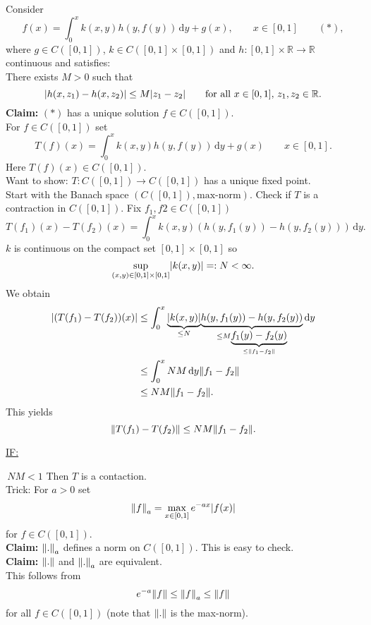 \begin{beispiel}
	Consider
	\[
		f(x) = \int_{0}^{x}k(x,y)h(y,f(y)) \,\mathrm{d}y + g(x), \qquad x \in [0,1] \qquad (*),
	\]
	where $g \in C([0,1])$, $k \in C([0,1] \times [0,1])$ and $h: [0,1] \times \mathbb{R} \to \mathbb{R}$ continuous and satisfies: \\
	There exists $M>0$ such that
	\[
		\lvert h(x,z_1)-h(x,z_2)\rvert \leq M \lvert z_1- z_2\rvert \qquad \text{for all }x \in [0,1],\,z_1,z_2 \in \mathbb{R}.
	\]
	\textbf{Claim:} \text{    }     $(*)$ has a unique solution $f \in C([0,1])$. \\ For $f \in C([0,1])$ set
	\[
		T(f)(x) = \int_{0}^{x}k(x,y)h(y,f(y)) \,\mathrm{d}y + g(x) \qquad x \in [0,1].
	\]
	Here $T(f)(x) \in C([0,1])$. \\ Want to show: $T: C([0,1]) \to C([0,1])$ has a unique fixed point. \\
	Start with the Banach space $(C([0,1]), \text{max-norm})$. Check if $T$ is a contraction in $C([0,1])$. Fix $f_1,f2 \in C([0,1])$
	\[
		T(f_1)(x)- T(f_2)(x) = \int_{0}^{x} k(x,y)(h(y,f_1(y))-h(y,f_2(y))) \,\mathrm{d}y.
	\] 
	$k$ is continuous on the compact set $[0,1] \times [0,1]$ so 
	\[
		\sup\limits_{(x,y) \in [0,1]\times[0,1]} \lvert k(x,y)\rvert =: N < \infty.
	\]
	We obtain 
	\begin{align*}
		\abs{(T(f_1)-T(f_2))(x)} &\leq \int_{0}^{x} \underset{\leq N}{\underbrace{\abs{k(x,y)}}}\underset{\leq M \underset{\leq \norm{f_1-f_2}}{\underbrace{f_1(y)-f_2(y)}}}{\underbrace{h(y,f_1(y))-h(y,f_2(y))}} \,\mathrm{d}y \\ & \leq \int_{0}^{x}NM \,\mathrm{d}y \norm{f_1-f_2} \\& \leq NM \norm{f_1-f_2}.
		\end{align*}
	This yields
	\[
		\norm{T(f_1)-T(f_2)} \leq NM \norm{f_1-f_2}.
	\]
	\begin{Large}
		\underline{IF:}
	\end{Large} \,$NM<1$ Then $T$ is a contaction. \\ Trick: For $a >0$ set 
	\[
		\norm{f}_a = \max\limits_{x \in [0,1]} e^{-ax}\abs{f(x)}
	\] 
	for $f \in C([0,1])$. \\
	\textbf{Claim:} \text{    }     $\norm{.}_a$ defines a norm on $C([0,1])$. This is easy to check. \\
	\textbf{Claim:} \text{    }     $\norm{.}$ and $\norm{.}_a$ are equivalent. \\
	This follows from
	\[
		e^{-a} \norm{f} \leq \norm{f}_a \leq \norm{f}
	\]
	for all $f \in C([0,1])$ (note that $\norm{.}$ is the max-norm).\\

\end{beispiel}
